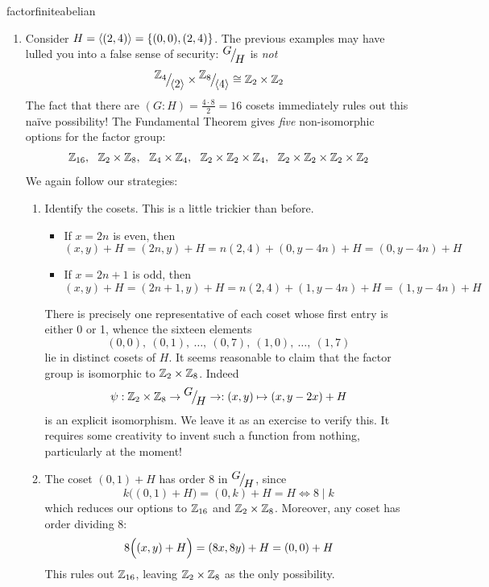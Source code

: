 \begin{examples}{}{factorfiniteabelian}
\begin{enumerate}
	\goodbreak

	\item\label{exs:factoriso3} Consider $H=\left\langle (2,4)\right\rangle=\{(0,0),(2,4)\}$. The previous examples may have lulled you into a false sense of security: ${}^{\textstyle {G}}\!\big/_{\textstyle \!{H}}$ is \emph{not}
	\[{}^{\textstyle {\mathbb{Z}_4}}\!\big/_{\textstyle \!{\left\langle 2\right\rangle}}\times{}^{\textstyle {\mathbb{Z}_8}}\!\big/_{\textstyle \!{\left\langle 4\right\rangle}}\cong\mathbb{Z}_2\times\mathbb{Z}_2\]
	The fact that there are $(G:H)=\frac{4\cdot 8}{2}=16$ cosets immediately rules out this naïve possibility!\smallbreak
	The Fundamental Theorem gives \emph{five} non-isomorphic options for the factor group:
	\[\Z_{16},\ \ \Z_2\times\Z_8,\ \ \Z_4\times\Z_4,\ \ \Z_2\times\Z_2\times\Z_4,\ \ \Z_2\times\Z_2\times\Z_2\times\Z_2\]
	We again follow our strategies:
	\begin{enumerate}
	  \item Identify the cosets. This is a little trickier than before.
	  \begin{itemize}
  		\item If $x=2n$ is even, then
  		\[(x,y)+H=(2n,y)+H=n(2,4)+(0,y-4n)+H=(0,y-4n)+H\]
  		\item If $x=2n+1$ is odd, then
  		\[(x,y)+H=(2n+1,y)+H=n(2,4)+(1,y-4n)+H=(1,y-4n)+H\]
  	\end{itemize}
 		There is precisely one representative of each coset whose first entry is either 0 or 1, whence the sixteen elements
		\[(0,0),\ (0,1),\ \ldots,\ (0,7),\ (1,0),\ \ldots,\ (1,7)\]
		lie in distinct cosets of $H$. It seems reasonable to claim that the factor group is isomorphic to $\mathbb{Z}_2\times\mathbb{Z}_8$. Indeed
  	\[\psi:\mathbb{Z}_2\times\mathbb{Z}_8\to{}^{\textstyle {G}}\!\big/_{\textstyle \!{H}}\to:(x,y)\mapsto (x,y-2x)+H\]
  	is an explicit isomorphism. We leave it as an exercise to verify this. It requires some creativity to invent such a function from nothing, particularly at the moment!
	  
		\item The coset $(0,1)+H$ has order 8 in ${}^{\textstyle {G}}\!\big/_{\textstyle \!{H}}$, since
		\[k\bigl((0,1)+H\bigr)=(0,k)+H=H\iff 8\mid k\]
		which reduces our options to $\mathbb{Z}_{16}$ and $\mathbb{Z}_2\times\mathbb{Z}_8$. Moreover, any coset has order dividing 8:
		\[8\Bigl((x,y)+H\Bigr)=(8x,8y)+H=(0,0)+H\]
  	This rules out $\mathbb{Z}_{16}$, leaving $\mathbb{Z}_2\times\mathbb{Z}_8$ as the only possibility.
	\end{enumerate}
	


\end{enumerate}
\end{examples}
